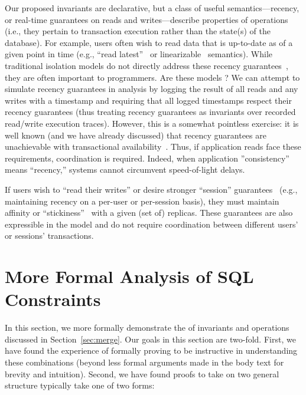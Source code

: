  Our proposed invariants are
declarative, but a class of useful semantics---recency, or real-time
guarantees on reads and writes---describe properties of operations
(i.e., they pertain to transaction execution rather than the state(s)
of the database). For example, users often wish to read data that is
up-to-date as of a given point in time (e.g., ``read
latest''~\cite{pnuts} or linearizable~\cite{gilbert-cap}
semantics). While traditional isolation models do not directly address
these recency guarantees~\cite{adya}, they are often important to
programmers. Are these models \iconfluent? We can attempt to simulate
recency guarantees in \iconfluence analysis by logging the result of
all reads and any writes with a timestamp and requiring that all
logged timestamps respect their recency guarantees (thus treating
recency guarantees as invariants over recorded read/write execution
traces). However, this is a somewhat pointless exercise: it is well
known (and we have already discussed) that recency guarantees are
unachievable with transactional
availability~\cite{hat-vldb,gilbert-cap,davidson-survey}. Thus, if
application reads face these requirements, coordination is
required. Indeed, when application ''consistency'' means ``recency,''
systems cannot circumvent speed-of-light delays.

If users wish to ``read their writes'' or desire stronger ``session''
guarantees~\cite{bayou} (e.g., maintaining recency on a per-user or
per-session basis), they must maintain affinity or
``stickiness''~\cite{hat-vldb} with a given (set of) replicas. These
guarantees are also expressible in the \iconfluence model and do
not require coordination between different users' or sessions'
transactions.


\section{More Formal \IConfluence Analysis of SQL Constraints}
\label{sec:ic-constraints}

In this section, we more formally demonstrate the \iconfluence of
invariants and operations discussed in Section~\ref{sec:merge}. Our
goals in this section are two-fold. First, we have found the
experience of formally proving \iconfluence to be instructive in
understanding these combinations (beyond less formal arguments made in
the body text for brevity and intuition). Second, we have found
\iconfluence proofs to take on two general structure typically take
one of two forms:

